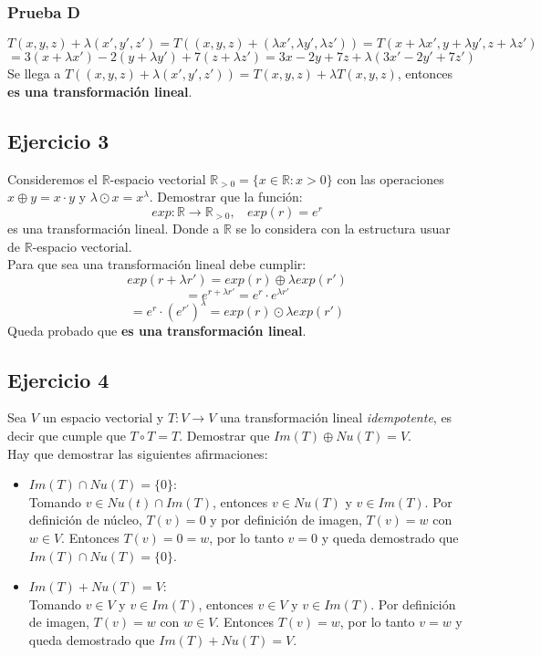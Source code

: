 \documentclass[a4paper,12pt]{article}
\begin{document}
\subsubsection{Prueba D}
$$
T(x,y,z)+\lambda(x',y',z')=T((x,y,z)+(\lambda x', \lambda y', \lambda z')) = T (x+\lambda x', y + \lambda y', z + \lambda z')
$$
$$
= 3(x+\lambda x')-2(y + \lambda y')+7(z + \lambda z') = 3x-2y+7z + \lambda (3x'-2y'+7z')
$$
Se llega a $T((x,y,z)+\lambda(x',y',z')) = T(x,y,z)+\lambda T(x,y,z)$, entonces \textbf{es una transformación lineal}.
\subsection{Ejercicio 3}
Consideremos el $\mathds{R}$-espacio vectorial $\mathds{R}_{>0}= \{ x\in\mathds{R} : x>0 \}$ con las operaciones $x \oplus y = x \cdot y$ y $\lambda \odot x = x^{\lambda}$. Demostrar que la función: $$exp:\mathds{R}\rightarrow\mathds{R}_{>0}, \ \ \ \ exp(r) = e^r$$ es una transformación lineal. Donde a $\mathds{R}$ se lo considera con la estructura usuar de $\mathds{R}$-espacio vectorial. \\
Para que sea una transformación lineal debe cumplir:
$$
exp(r+\lambda r')=exp(r)\oplus\lambda exp(r')
$$
$$
= e^{r+\lambda r'} = e^r \cdot e^{\lambda r'}
$$
$$
= e^r \cdot (e^{r'})^{\lambda} = exp(r) \odot \lambda exp(r')
$$
Queda probado que \textbf{es una transformación lineal}.
\subsection{Ejercicio 4}
Sea $V$ un espacio vectorial y $T:V\rightarrow V$ una transformación lineal \textit{idempotente}, es decir que cumple que $T\circ T=T$. Demostrar que $Im(T)\oplus Nu(T)=V$. \\
Hay que demostrar las siguientes afirmaciones:
\begin{itemize}
    \item $Im(T)\cap Nu(T)=\{0\}$: \\
    Tomando $v\in Nu(t) \cap Im(T)$, entonces $v\in Nu(T)$ y $v\in Im(T)$. Por definición de núcleo, $T(v)=0$ y por definición de imagen, $T(v)=w$ con $w\in V$. Entonces $T(v)=0=w$, por lo tanto $v=0$ y queda demostrado que $Im(T)\cap Nu(T)=\{0\}$.
    \item $Im(T)+Nu(T)=V$: \\
    Tomando $v\in V$ y $v\in Im(T)$, entonces $v\in V$ y $v\in Im(T)$. Por definición de imagen, $T(v)=w$ con $w\in V$. Entonces $T(v)=w$, por lo tanto $v=w$ y queda demostrado que $Im(T)+Nu(T)=V$.
\end{itemize}
\end{document}
